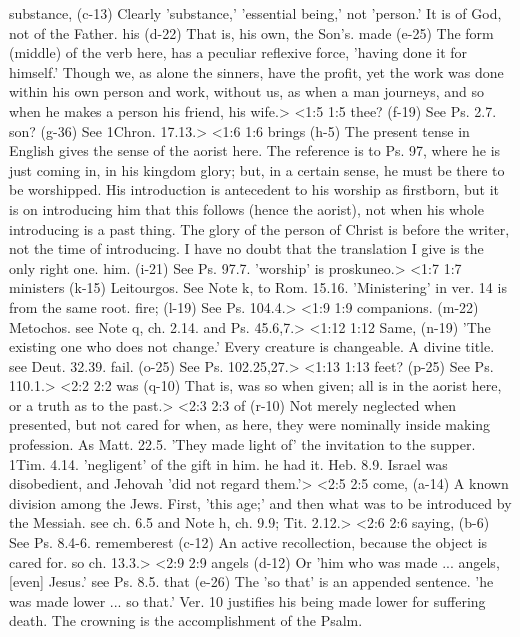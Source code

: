   substance, (c-13)  Clearly 'substance,' 'essential being,' not 'person.' It is  of God, not of the Father.
  his (d-22)  That is, his own, the Son's.
  made (e-25)  The form (middle) of the verb here, has a peculiar reflexive  force, 'having done it for himself.' Though we, as alone the  sinners, have the profit, yet the work was done within his own  person and work, without us, as when a man journeys, and so  when he makes a person his friend, his wife.>
<1:5 1:5  thee? (f-19)  See Ps. 2.7.
  son? (g-36)  See 1Chron. 17.13.>
<1:6 1:6  brings (h-5)  The present tense in English gives the sense of the aorist  here. The reference is to Ps. 97, where he is just coming in,  in his kingdom glory; but, in a certain sense, he must be there  to be worshipped. His introduction is antecedent to his worship  as firstborn, but it is on introducing him that this follows  (hence the aorist), not when his whole introducing is a past  thing. The glory of the person of Christ is before the writer,  not the time of introducing. I have no doubt that the  translation I give is the only right one.
 him. (i-21)  See Ps. 97.7. 'worship' is proskuneo.>
<1:7 1:7  ministers (k-15)  Leitourgos. See Note k, to Rom. 15.16. 'Ministering' in  ver. 14 is from the same root.
  fire; (l-19)  See Ps. 104.4.>
<1:9 1:9  companions. (m-22)  Metochos. see Note q, ch. 2.14. and Ps. 45.6,7.>
<1:12 1:12  Same, (n-19)  'The existing one who does not change.' Every creature is  changeable. A divine title. see Deut. 32.39.
  fail. (o-25)  See Ps. 102.25,27.>
<1:13 1:13  feet? (p-25)  See Ps. 110.1.>
<2:2 2:2  was (q-10)  That is, was so when given; all is in the aorist here, or a  truth as to the past.>
<2:3 2:3  of (r-10)  Not merely neglected when presented, but not cared for when,  as here, they were nominally inside making profession. As Matt. 22.5.  'They made light of' the invitation to the supper. 1Tim. 4.14.  'negligent' of the gift in him. he had it. Heb. 8.9.  Israel was disobedient, and Jehovah 'did not regard them.'>
<2:5 2:5  come, (a-14)  A known division among the Jews. First, 'this age;' and then  what was to be introduced by the Messiah. see ch. 6.5 and Note  h, ch. 9.9; Tit. 2.12.>
<2:6 2:6  saying, (b-6)  See Ps. 8.4-6.
  rememberest (c-12)  An active recollection, because the object is cared for. so ch. 13.3.>
<2:9 2:9  angels (d-12)  Or 'him who was made ... angels, [even] Jesus.' see Ps. 8.5.
  that (e-26)  The 'so that' is an appended sentence. 'he was made lower ...  so that.' Ver. 10 justifies his being made lower for suffering  death. The crowning is the accomplishment of the Psalm.

